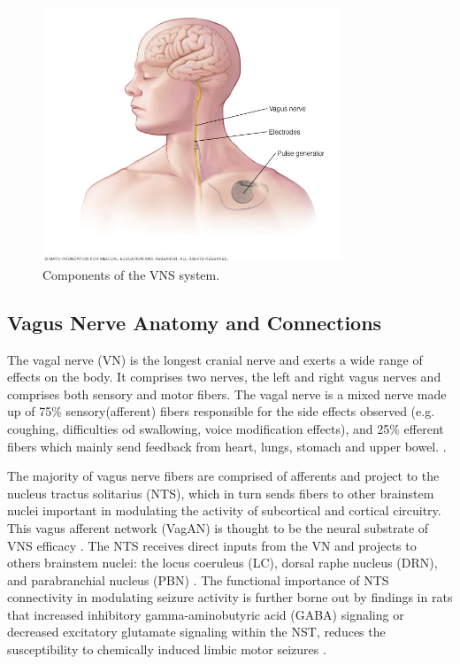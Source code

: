 \begin{figure}[h]
  \centering
  \includegraphics[width=0.8\textwidth]{images/vagus_nerve_stimulation.jpg}
  \caption{Components of the VNS system.}
  \label{fig:Vagus Nerve Stimulation}
\end{figure}

  \subsection*{Vagus Nerve Anatomy and Connections}
  The vagal nerve (VN) is the longest cranial nerve and exerts a wide range of effects on the body. It comprises two nerves, the left and right vagus nerves and comprises both sensory and motor fibers.
  The vagal nerve is a mixed nerve made up of 75\% sensory(afferent) fibers responsible for the side effects observed (e.g. coughing, difficulties od swallowing, voice modification effects), and 25\% efferent fibers which mainly send feedback from heart, lungs, stomach and upper bowel.  \cite{BonazSinniger2017}.

  The majority of vagus nerve fibers are comprised of afferents and project to the nucleus tractus solitarius (NTS), which in turn sends fibers to other brainstem nuclei important in modulating the activity of subcortical and cortical circuitry. This vagus afferent network (VagAN) is
  thought to be the neural substrate of VNS efficacy \cite{HanchemWongIbrahim2018}. 
  The NTS receives direct inputs from the VN and projects to others brainstem nuclei: the locus coeruleus (LC), dorsal raphe nucleus (DRN), and parabranchial nucleus (PBN) \cite{RICARDO19781}. The functional importance of NTS connectivity in modulating seizure activity is further borne out by findings in rats that increased inhibitory gamma-aminobutyric acid (GABA) signaling or decreased excitatory glutamate signaling within the NST, reduces the susceptibility to chemically induced limbic motor seizures \cite{GABA}.

